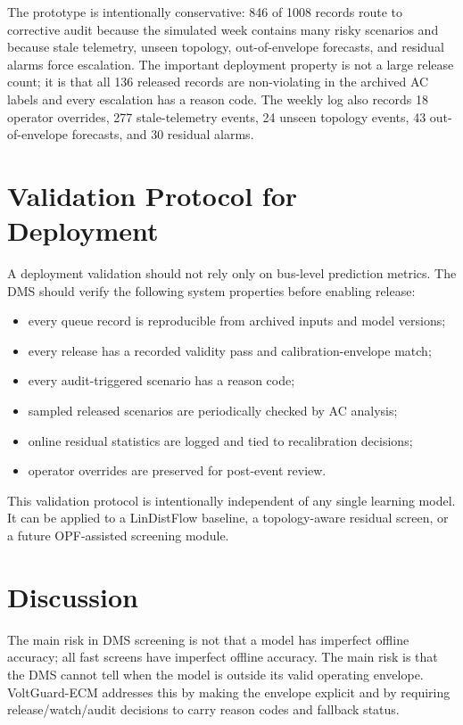 \documentclass[
  preprint,12pt]{elsarticle}
\providecommand{\tightlist}{%
  \setlength{\itemsep}{0pt}\setlength{\parskip}{0pt}}
\begin{document}
The prototype is intentionally conservative: 846 of 1008 records route
to corrective audit because the simulated week contains many risky
scenarios and because stale telemetry, unseen topology, out-of-envelope
forecasts, and residual alarms force escalation. The important
deployment property is not a large release count; it is that all 136
released records are non-violating in the archived AC labels and every
escalation has a reason code. The weekly log also records 18 operator
overrides, 277 stale-telemetry events, 24 unseen topology events, 43
out-of-envelope forecasts, and 30 residual alarms.

\section{Validation Protocol for
Deployment}\label{validation-protocol-for-deployment}

A deployment validation should not rely only on bus-level prediction
metrics. The DMS should verify the following system properties before
enabling release:

\begin{itemize}
\tightlist
\item
  every queue record is reproducible from archived inputs and model
  versions;
\item
  every release has a recorded validity pass and calibration-envelope
  match;
\item
  every audit-triggered scenario has a reason code;
\item
  sampled released scenarios are periodically checked by AC analysis;
\item
  online residual statistics are logged and tied to recalibration
  decisions;
\item
  operator overrides are preserved for post-event review.
\end{itemize}

This validation protocol is intentionally independent of any single
learning model. It can be applied to a LinDistFlow baseline, a
topology-aware residual screen, or a future OPF-assisted screening
module.

\section{Discussion}\label{discussion}

The main risk in DMS screening is not that a model has imperfect offline
accuracy; all fast screens have imperfect offline accuracy. The main
risk is that the DMS cannot tell when the model is outside its valid
operating envelope. VoltGuard-ECM addresses this by making the envelope
explicit and by requiring release/watch/audit decisions to carry reason
codes and fallback status.
\end{document}
